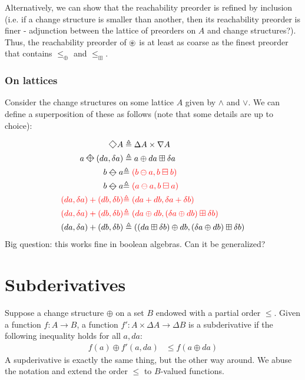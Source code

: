 \documentclass[english]{article}
\newcommand{\als}[1]{\begin{align*} #1 \end{align*}}
\newcommand{\red}[1]{{\color{red} #1}}
\theoremstyle{plain}
\theoremstyle{remark}
\theoremstyle{remark}
\theoremstyle{remark}
\theoremstyle{definition}
\theoremstyle{definition}
\newcommand{\ra}[0]{\rightarrow}
\newcommand{\kite}[0]{\mathbin{\rotatebox[origin=c]{45}{$\boxtimes$}}}
\newcommand{\kminus}[0]{\mathbin{\rotatebox[origin=c]{-45}{$\boxslash$}}}
\newcommand{\Dia}[0]{\mathbin{\rotatebox[origin=c]{45}{$\square$}}}
\begin{document}
Alternatively, we can show that the reachability preorder is refined by inclusion (i.e. if a
change structure is smaller than another, then its reachability preorder is finer - adjunction
between the lattice of preorders on $A$ and change structures?). Thus, the reachability preorder of
$\circledast$ is at least as coarse as the finest preorder that contains $\leq_\oplus$ and $\leq_\boxplus$.

\subsubsection{On lattices}

Consider the change structures on some lattice $A$ given by $\wedge$ and $\vee$. We can define
a superposition of these as follows (note that some details are up to choice):

\begin{align*}
  \Dia A &\triangleq \Delta A \times \nabla A\\
  a \kite (da, \delta a) &\triangleq a \oplus da \boxplus \delta a\\
  b \kminus a &{\triangleq \red{(b \ominus a, b \boxminus b)}}\\
  b \kminus a &{\triangleq \red{(a \ominus a, b \boxminus a)}}\\
  \red{(da, \delta a) + (db, \delta b) }&\red{\triangleq (da + db, \delta a + \delta b)}\\
  \red{(da, \delta a) + (db, \delta b) }&\red{\triangleq
  (da \oplus db, (\delta a \oplus db) \boxplus \delta b)}\\
  (da, \delta a) + (db, \delta b) &\triangleq
  ((da \boxplus \delta b) \oplus db, (\delta a \oplus db) \boxplus \delta b)\\
\end{align*}
Big question: this works fine in boolean algebras. Can it be generalized?

\section{Subderivatives}

Suppose a change structure $\oplus$ on a set $B$ endowed with a partial order $\leq$. Given
a function $f : A \ra B$, a function $f' : A \times \Delta A \ra \Delta B$ is a subderivative
if the following inequality holds for all $a, da$: \als{
  f(a) \oplus f'(a, da) &\leq f(a \oplus da)
}
A supderivative is exactly the same thing, but the other way around. We abuse the notation
and extend the order $\leq$ to $B$-valued functions.
\end{document}
